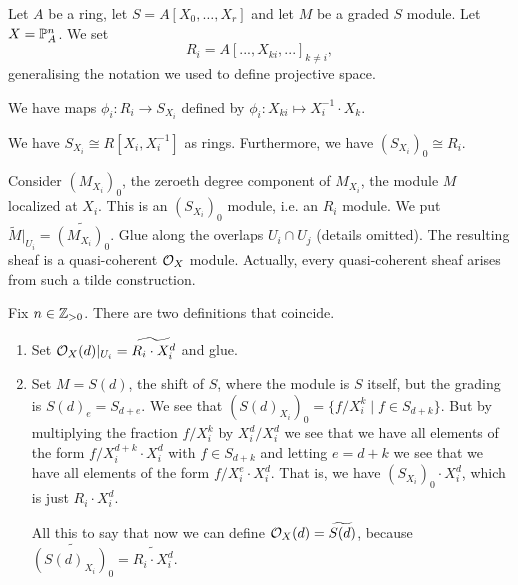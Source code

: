 \begin{notation}
	Let $A$ be a ring, let $S = A[X_0, \dots, X_r]$ and let $M$ be a graded $S$ module. Let $X = \mathbb{P}^n_A$. We set \[R_i = A[..., X_{ki}, ...]_{k\neq i},\] generalising the notation we used to define projective space. 

	We have maps $\phi_i: R_i \to S_{X_i}$ defined by $\phi_i: X_{ki} \mapsto X_i^{-1} \cdot X_k$.
\end{notation}
\begin{rmk}
	We have $S_{X_i} \cong R[X_i, X_{i}^{-1}]$ as rings. Furthermore, we have $(S_{X_i})_0 \cong R_i$. 
\end{rmk}

\begin{definition}
	Consider $(M_{X_i})_0$, the zeroeth degree component of $M_{X_i}$, the module $M$ localized at $X_i$. This is an $(S_{X_i})_0$ module, i.e. an $R_i$ module. We put $\widetilde{M}|_{U_i} = \widetilde{(M_{X_i})_0}$. Glue along the overlaps $U_i \cap U_j$ (details omitted). The resulting sheaf is a quasi-coherent $\mathcal{O}_X$ module. Actually, every quasi-coherent sheaf arises from such a tilde construction.
\end{definition}

\begin{definition}
	Fix $n \in \mathbb{Z}_{> 0}$. There are two definitions that coincide. 
	\begin{enumerate}
    	\item Set $\mathcal{O}_X(d)|_{U_i} = \widetilde{R_i \cdot X^d_i}$ and glue. 
		\item Set $M = S(d)$, the shift of $S$, where the module is $S$ itself, but the grading is $S(d)_e = S_{d+e}$. 
		We see that $(S(d)_{X_i})_0 = \{f/X_i^k \mid f \in S_{d+k}\}$. But by multiplying the fraction $f/X_{i}^k$ by $X_{i}^d/X_{i}^d$ we see that we have all elements of the form $f/X_i^{d+k} \cdot X_i^d$ with $f \in S_{d+k}$ and letting $e = d+k$ we see that we have all elements of the form $f/X_i^e \cdot X_i^d$. That is, we have $(S_{X_i})_0 \cdot X_i^d$, which is just $R_i \cdot X_i^d$. 

		All this to say that now we can define $\mathcal{O}_X(d) = \widetilde{S(d)}$, because $\widetilde{(S(d)_{X_i})_0} = \widetilde{R_i \cdot X_i^d}$. 
    \end{enumerate}
\end{definition}


